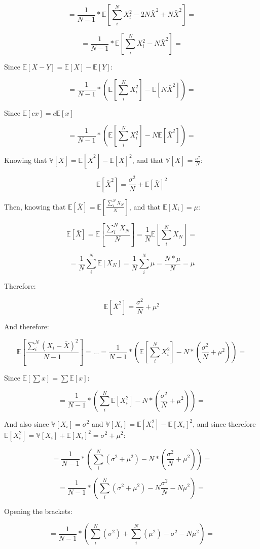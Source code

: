 \documentclass{article}
\begin{document}
$$= \frac{1}{N-1} * \mathbb{E}[\sum_i^N X_i^2 - 2N\bar{X}^2 + N\bar{X}^2]=$$

$$= \frac{1}{N-1} * \mathbb{E}[\sum_i^N X_i^2 - N\bar{X}^2]=$$

Since $\mathbb{E}[X - Y]=\mathbb{E}[X]-\mathbb{E}[Y]$:

$$= \frac{1}{N-1} * (\mathbb{E}[\sum_i^N X_i^2] - \mathbb{E}[N\bar{X}^2])=$$

Since $\mathbb{E}[cx] = c\mathbb{E}[x]$

$$= \frac{1}{N-1} * (\mathbb{E}[\sum_i^N X_i^2] - N\mathbb{E}[\bar{X}^2])=$$

Knowing that $\mathbb{V}[\bar{X}]=\mathbb{E}[\bar{X}^2] - \mathbb{E}[\bar{X}]^2$, and that $\mathbb{V}[\bar{X}]=\frac{\sigma^2}{N}$:

$$\mathbb{E}[\bar{X}^2]=\frac{\sigma^2}{N} + \mathbb{E}[\bar{X}]^2$$

Then, knowing that $\mathbb{E}[\bar{X}]=\mathbb{E}[\frac{\sum_i^N X_N}{N}]$, and that $\mathbb{E}[X_i]=\mu$:

$$\mathbb{E}[\bar{X}]=\mathbb{E}[\frac{\sum_i^N X_N}{N}]=\frac{1}{N}\mathbb{E}[\sum_i^N X_N]=$$

$$=\frac{1}{N}\sum_i^N\mathbb{E}[X_N]=\frac{1}{N}\sum_i^N \mu=\frac{N*\mu}{N}=\mu$$

Therefore:

$$\mathbb{E}[\bar{X}^2]=\frac{\sigma^2}{N} + \mu^2$$

And therefore:

$$\mathbb{E}[ \frac{\sum_i^N (X_i - \bar{X})^2}{N-1} ]=...=\frac{1}{N-1} * (\mathbb{E}[\sum_i^N X_i^2] - N*(\frac{\sigma^2}{N} + \mu^2))=$$

Since $\mathbb{E}[\sum x] = \sum \mathbb{E}[x]$:

$$=\frac{1}{N-1} * (\sum_i^N \mathbb{E}[X_i^2] - N*(\frac{\sigma^2}{N} + \mu^2))=$$

And also since $\mathbb{V}[X_i]=\sigma^2$ and $\mathbb{V}[X_i]=\mathbb{E}[X_i^2] - \mathbb{E}[X_i]^2$, and since therefore $\mathbb{E}[X_i^2]=\mathbb{V}[X_i] + \mathbb{E}[X_i]^2=\sigma^2 + \mu^2$:

$$=\frac{1}{N-1} * (\sum_i^N (\sigma^2 + \mu^2) - N*(\frac{\sigma^2}{N} + \mu^2))=$$

$$=\frac{1}{N-1} * (\sum_i^N (\sigma^2 + \mu^2) - N\frac{\sigma^2}{N} - N\mu^2)=$$

Opening the brackets:

$$=\frac{1}{N-1} * (\sum_i^N (\sigma^2) + \sum_i^N (\mu^2) - \sigma^2 - N\mu^2)=$$
\end{document}
